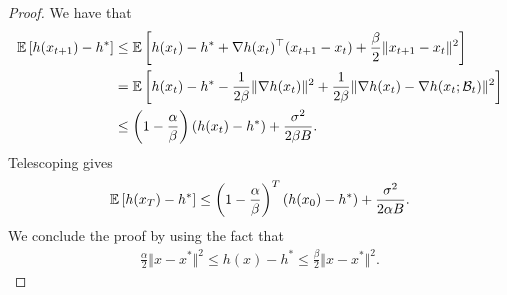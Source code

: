 \begin{proof}
We have that
    \begin{align*}
         {\mathbb{E}} \left[ h(x_{t+1}) - h^*\right] 
        &\le {\mathbb{E}} \left[ h(x_t) - h^* + \nabla h(x_t)^\top (x_{t+1} - x_t) + \frac{\beta}{2} \Vert x_{t+1} - x_t \Vert^2 \right]\\
        &= {\mathbb{E}} \left[ h(x_t) - h^* - \frac{1}{2\beta} \Vert \nabla h(x_t) \Vert^2 + \frac{1}{2 \beta} \Vert \nabla h(x_t) -  \nabla h(x_t; {\mathcal{B}}_t) \Vert^2 \right] \\
        &\le \left( 1 - \frac{\alpha}{\beta}\right) \left( h(x_t) - h^* \right) + \frac{\sigma^2}{2 \beta B}.
    \end{align*}
Telescoping gives 
\begin{align*}
    {\mathbb{E}} \left[ h(x_T) - h^*\right] \le \left(1 - \frac{\alpha}{\beta} \right)^T  \left( h(x_0) - h^* \right)  + \frac{\sigma^2}{2 \alpha B}.
\end{align*}
We conclude the proof by using the fact that
\begin{align*}
    \frac{\alpha}{2} \Vert x - x^* \Vert^2 \le h(x) - h^* \le \frac{\beta}{2} \Vert x - x^* \Vert^2. 
\end{align*}
\end{proof}

